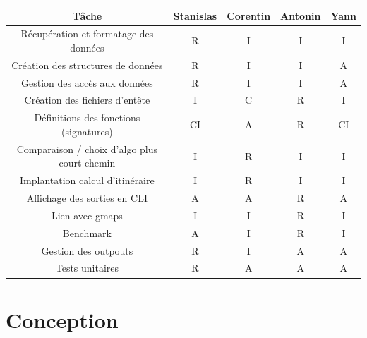 \documentclass[a4paper, 12pt]{report}
\begin{document}
\begin{table}[htbp]
    \centering\begin{tabular}{|c|c|c|c|c|}
        \hline
        Tâche & Stanislas & Corentin & Antonin & Yann \\
        \hline\hline
        Récupération et formatage des données & R & I & I & I \\
        \hline
        Création des structures de données & R & I & I & A \\
        \hline
        Gestion des accès aux données & R & I & I & A \\
        \hline
        Création des fichiers d'entête & I & C & R & I \\
        \hline
        Définitions des fonctions (signatures) & CI & A & R & CI \\
        \hline
        Comparaison / choix d'algo plus court chemin & I & R & I & I \\
        \hline
        Implantation calcul d'itinéraire & I & R & I & I \\
        \hline
        Affichage des sorties en CLI & A & A & R & A \\
        \hline
        Lien avec gmaps & I & I & R & I \\
        \hline
        Benchmark & A & I & R & I \\
        \hline
        Gestion des outpouts & R & I & A & A \\
        \hline
        Tests unitaires & R & A & A & A \\
        \hline
        \end{tabular}
\end{table}

\clearpage

\section{Conception}
\end{document}
